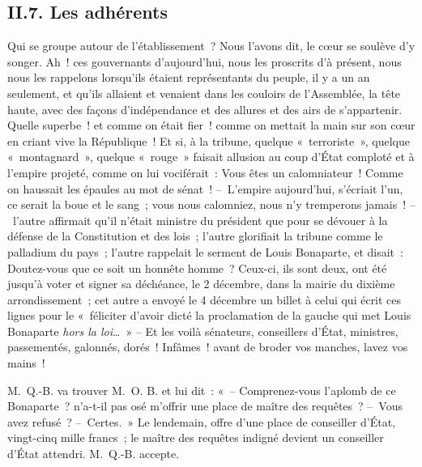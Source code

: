 \documentclass[french,twoside]{book} %
\begin{document}
\subsection[{II.7. Les adhérents}]{II.7. Les adhérents}
\noindent Qui se groupe autour de l’établissement ? Nous l’avons dit, le cœur se soulève d’y songer. Ah ! ces gouvernants d’aujourd’hui, nous les proscrits d’à présent, nous nous les rappelons lorsqu’ils étaient représentants du peuple, il y a un an seulement, et qu’ils allaient et venaient dans les couloirs de l’Assemblée, la tête haute, avec des façons d’indépendance et des allures et des airs de s’appartenir. Quelle superbe ! et comme on était fier ! comme on mettait la main sur son cœur en criant vive la République ! Et si, à la tribune, quelque « terroriste », quelque « montagnard », quelque « rouge » faisait allusion au coup d’État comploté et à l’empire projeté, comme on lui vociférait : Vous êtes un calomniateur ! Comme on haussait les épaules au mot de sénat ! – L’empire aujourd’hui, s’écriait l’un, ce serait la boue et le sang ; vous nous calomniez, nous n’y tremperons jamais ! – l’autre affirmait qu’il n’était ministre du président que pour se dévouer à la défense de la Constitution et des lois ; l’autre glorifiait la tribune comme le palladium du pays ; l’autre rappelait le serment de Louis Bonaparte, et disait : Doutez-vous que ce soit un honnête homme ? Ceux-ci, ils sont deux, ont été jusqu’à voter et signer sa déchéance, le 2 décembre, dans la mairie du dixième arrondissement ; cet autre a envoyé le 4 décembre un billet à celui qui écrit ces lignes pour le « féliciter d’avoir dicté la proclamation de la gauche qui met Louis Bonaparte \emph{hors la loi}… » – Et les voilà sénateurs, conseillers d’État, ministres, passementés, galonnés, dorés ! Infâmes ! avant de broder vos manches, lavez vos mains !\par
M. Q.-B. va trouver M. O. B. et lui dit : « – Comprenez-vous l’aplomb de ce Bonaparte ? n’a-t-il pas osé m’offrir une place de maître des requêtes ? – Vous avez refusé ? – Certes. » Le lendemain, offre d’une place de conseiller d’État, vingt-cinq mille francs ; le maître des requêtes indigné devient un conseiller d’État attendri. M. Q.-B. accepte.\par
\end{document}
